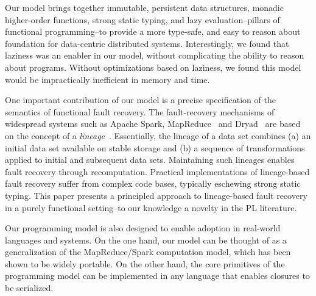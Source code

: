 \documentclass[preprint]{sigplanconf}
\theoremstyle{definition}
\theoremstyle{definition}
\begin{document}
Our model brings together immutable, persistent data structures, monadic
higher-order functions, strong static typing, and lazy evaluation--pillars of
functional programming--to provide a more type-safe, and easy to reason about
foundation for data-centric distributed systems. Interestingly, we found that
laziness was an enabler in our model, without complicating the ability to
reason about programs. Without optimizations based on laziness, we found this
model would be impractically inefficient in memory and time.

One important contribution of our model is a precise specification of the
semantics of functional fault recovery. The fault-recovery mechanisms of
widespread systems such as Apache Spark, MapReduce~\cite{MapReduce} and
Dryad~\cite{Dryad} are based on the concept of a
\emph{lineage}~\cite{Lineage1, Lineage2}. Essentially, the lineage of a data set
combines (a) an initial data set available on stable storage and (b) a
sequence of transformations applied to initial and subsequent data sets.
Maintaining such lineages enables fault recovery through recomputation.
Practical implementations of lineage-based fault recovery suffer from complex
code bases, typically eschewing strong static typing. This paper presents a
principled approach to lineage-based fault recovery in a purely functional
setting--to our knowledge a novelty in the PL literature.

Our programming model is also designed to enable adoption in real-world
languages and systems. On the one hand, our model can be thought of as a
generalization of the MapReduce/Spark computation model, which has been shown
to be widely portable. On the other hand, the core primitives of the
programming model can be implemented in any language that enables closures to
be serialized.


\end{document}
